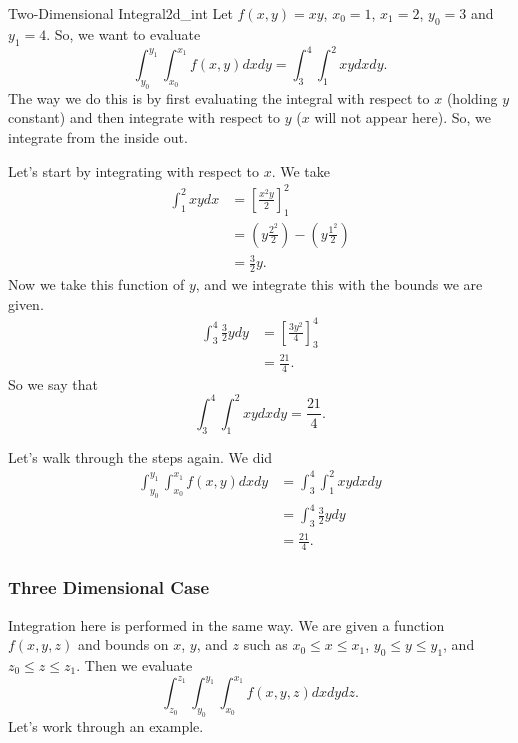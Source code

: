         \begin{ex}{Two-Dimensional Integral}{2d_int}
        Let $f(x,y)=xy$, $x_0=1$, $x_1=2$, $y_0=3$ and $y_1=4$.  So, we want to evaluate
        \[
        \int_{y_0}^{y_1}\int_{x_0}^{x_1} f(x,y)dxdy = \int_3^4 \int_1^2 xy dxdy.
        \]
        The way we do this is by first evaluating the integral with respect to $x$ (holding $y$ constant) and then integrate with respect to $y$ ($x$ will not appear here). So, we integrate from the inside out.  
        
        Let's start by integrating with respect to $x$. We take
        \begin{align*}
            \int_1^2 xy dx &= \left[ \frac{x^2y}{2}\right]_1^2\\
            &= \left( y\frac{2^2}{2}\right) - \left(y\frac{1^2}{2}\right)\\
            &=\frac{3}{2}y.
        \end{align*}
        Now we take this function of $y$, and we integrate this with the bounds we are given.  
        \begin{align*}
            \int_3^4 \frac{3}{2}y dy &= \left[ \frac{3y^2}{4} \right]_3^4\\
            &= \frac{21}{4}.
        \end{align*}
        So we say that
        \[
        \int_3^4 \int_1^2 xy dxdy = \frac{21}{4}.
        \]
        
        Let's walk through the steps again. We did
        \begin{align*}
            \int_{y_0}^{y_1} \int_{x_0}^{x_1} f(x,y)dxdy&= \int_3^4\int_1^2 xy dxdy\\
            &= \int_3^4 \frac{3}{2}ydy \\
            &= \frac{21}{4}.
        \end{align*}
        \end{ex}
        
        \subsubsection{Three Dimensional Case}
        
        Integration here is performed in the same way.  We are given a function $f(x,y,z)$ and bounds on $x$, $y$, and $z$ such as $x_0\leq x \leq x_1$, $y_0\leq y\leq y_1$, and $z_0\leq z \leq z_1$. Then we evaluate
        \[
        \int_{z_0}^{z_1}\int_{y_0}^{y_1}\int_{x_0}^{x_1} f(x,y,z)dxdydz.
        \]
        Let's work through an example.
        

